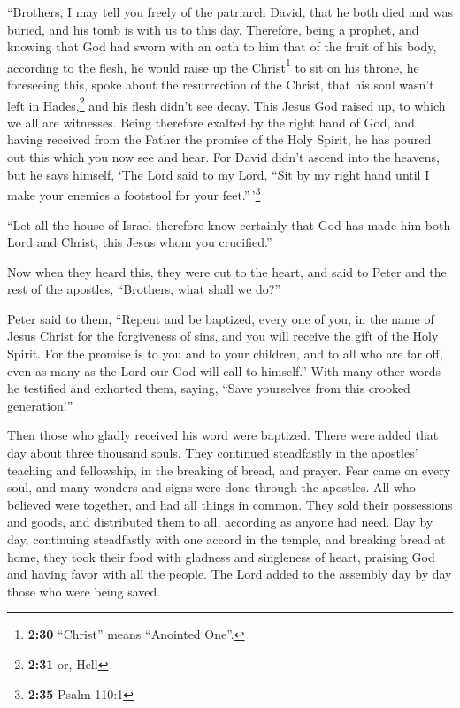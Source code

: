  ``Brothers, I may tell you freely of the patriarch
David, that he both died and was buried, and his tomb is with us to this
day.  Therefore, being a prophet, and knowing that God
had sworn with an oath to him that of the fruit of his body, according
to the flesh, he would raise up the Christ\footnote{\textbf{2:30}
  ``Christ'' means ``Anointed One''.} to sit on his throne,
 he foreseeing this, spoke about the resurrection of the
Christ, that his soul wasn't left in Hades,\footnote{\textbf{2:31} or,
  Hell} and his flesh didn't see decay.  This Jesus God
raised up, to which we all are witnesses.  Being
therefore exalted by the right hand of God, and having received from the
Father the promise of the Holy Spirit, he has poured out this which you
now see and hear.  For David didn't ascend into the
heavens, but he says himself, `The Lord said to my Lord, ``Sit by my
right hand  until I make your enemies a footstool for
your feet.''\,'\footnote{\textbf{2:35} Psalm 110:1}

 ``Let all the house of Israel therefore know certainly
that God has made him both Lord and Christ, this Jesus whom you
crucified.''

 Now when they heard this, they were cut to the heart,
and said to Peter and the rest of the apostles, ``Brothers, what shall
we do?''

 Peter said to them, ``Repent and be baptized, every one
of you, in the name of Jesus Christ for the forgiveness of sins, and you
will receive the gift of the Holy Spirit.  For the
promise is to you and to your children, and to all who are far off, even
as many as the Lord our God will call to himself.''  With
many other words he testified and exhorted them, saying, ``Save
yourselves from this crooked generation!''

 Then those who gladly received his word were baptized.
There were added that day about three thousand souls. 
They continued steadfastly in the apostles' teaching and fellowship, in
the breaking of bread, and prayer.  Fear came on every
soul, and many wonders and signs were done through the apostles.
 All who believed were together, and had all things in
common.  They sold their possessions and goods, and
distributed them to all, according as anyone had need. 
Day by day, continuing steadfastly with one accord in the temple, and
breaking bread at home, they took their food with gladness and
singleness of heart,  praising God and having favor with
all the people. The Lord added to the assembly day by day those who were
being saved.


